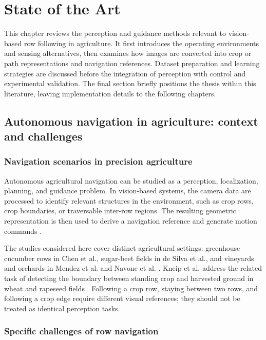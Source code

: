 \chapter{State of the Art}
\label{cap:stato_arte}

This chapter reviews the perception and guidance methods relevant to
vision-based row following in agriculture. It first introduces the
operating environments and sensing alternatives, then examines how
images are converted into crop or path representations and navigation
references. Dataset preparation and learning strategies are discussed
before the integration of perception with control and experimental
validation. The final section briefly positions the thesis within this
literature, leaving implementation details to the following chapters.

\section{Autonomous navigation in agriculture: context and challenges}
\label{sec:navigazione_contesto}

\subsection{Navigation scenarios in precision agriculture}
\label{subsec:scenari_navigazione}

Autonomous agricultural navigation can be studied as a perception,
localization, planning, and guidance problem. In vision-based systems,
the camera data are processed to identify relevant structures in the
environment, such as crop rows, crop boundaries, or traversable
inter-row regions. The resulting geometric representation is then used
to derive a navigation reference and generate motion commands
\cite{bai2023vision}.

The studies considered here cover distinct agricultural settings:
greenhouse cucumber rows in Chen et al., sugar-beet fields in de Silva
et al., and vineyards and orchards in Mendez et al. and Navone et al.
\cite{chen2021navigation,silva2023rowdetection,mendez2023vineyards,
navone2025gpsfree}. Kneip et al. address the related task of detecting
the boundary between standing crop and harvested ground in wheat and
rapeseed fields \cite{kneip2020cropedge}. Following a crop row, staying
between two rows, and following a crop edge require different visual
references; they should not be treated as identical perception tasks.

\subsection{Specific challenges of row navigation}
\label{subsec:sfide_navigazione}

